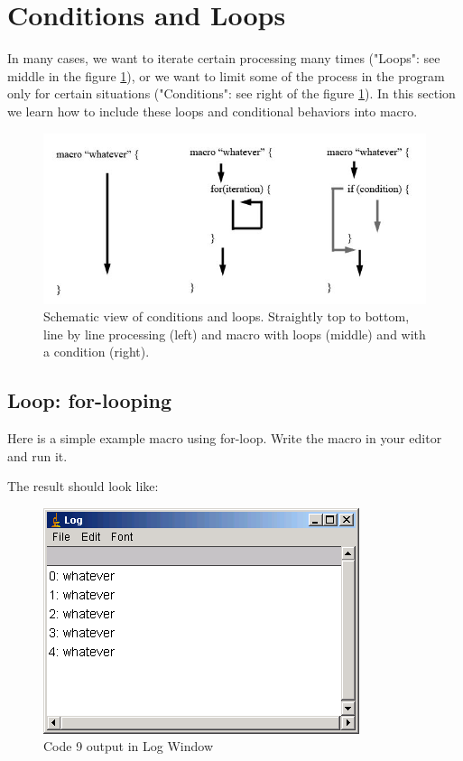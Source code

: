 \documentclass[11pt,a4paper,oneside]{report}
\begin{document}
\section{Conditions and Loops}
In many cases, we want to iterate certain processing many times ("Loops": see middle in the figure \ref{fig_scriptscheme}), or we want to limit some of the process in the program only for certain situations ("Conditions": see right of the figure \ref{fig_scriptscheme}). In this section we learn how to include these loops and conditional behaviors into macro. 

\begin{figure}[htbp]
\begin{center}
\includegraphics[width=\textwidth]{fig/fig23_1_ScriptSchemes.png}
\caption{Schematic view of conditions and loops. Straightly top to bottom, line by line processing (left) and macro with loops (middle) and with a condition (right).} \label{fig_scriptscheme}
\end{center}
\end{figure}

\subsection{Loop: for-looping}
Here is a simple example macro using for-loop. Write the macro in your editor and run it. 

The result should look like:

\begin{figure}[htbp]
\begin{center}
\includegraphics[scale=0.6]{fig/fig2311_whatever5.png}
\caption{Code 9 output in Log Window}
\label{fig_whateverOut}
\end{center}
\end{figure}
\end{document}
